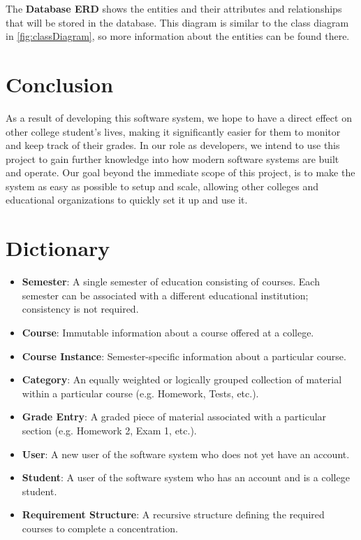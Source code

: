 \documentclass[12pt]{article}
\newcommand{\dictitem}[1]{\item \textbf{#1}:}
\newenvironment{dict}
{
    \begin{itemize}
}
{
    \end{itemize}
}
\begin{document}
\clearpage

The \textbf{Database ERD} shows the entities and their attributes and relationships that will be
stored in the database. This diagram is similar to the class diagram in \autoref{fig:classDiagram},
so more information about the entities can be found there.

\clearpage


\section{Conclusion}
As a result of developing this software system, we hope to have a direct effect on other college
student's lives, making it significantly easier for them to monitor and keep track of their grades.
In our role as developers, we intend to use this project to gain further knowledge into how modern
software systems are built and operate. Our goal beyond the immediate scope of this project, is to
make the system as easy as possible to setup and scale, allowing other colleges and educational
organizations to quickly set it up and use it.

\section{Dictionary}
\begin{dict}
    \dictitem{Semester} A single semester of education consisting of courses. Each semester can
    be associated with a different educational institution; consistency is not required.
    \dictitem{Course} Immutable information about a course offered at a college.
    \dictitem{Course Instance} Semester-specific information about a particular course.
    \dictitem{Category} An equally weighted or logically grouped collection of material within a
    particular course (e.g. Homework, Tests, etc.).
    \dictitem{Grade Entry} A graded piece of material associated with a particular section 
    (e.g. Homework 2, Exam 1, etc.).
    \dictitem{User} A new user of the software system who does not yet have an account.
    \dictitem{Student} A user of the software system who has an account and is a college student.
    \dictitem{Requirement Structure} A recursive structure defining the required courses to complete
    a concentration.
\end{dict}
\end{document}
